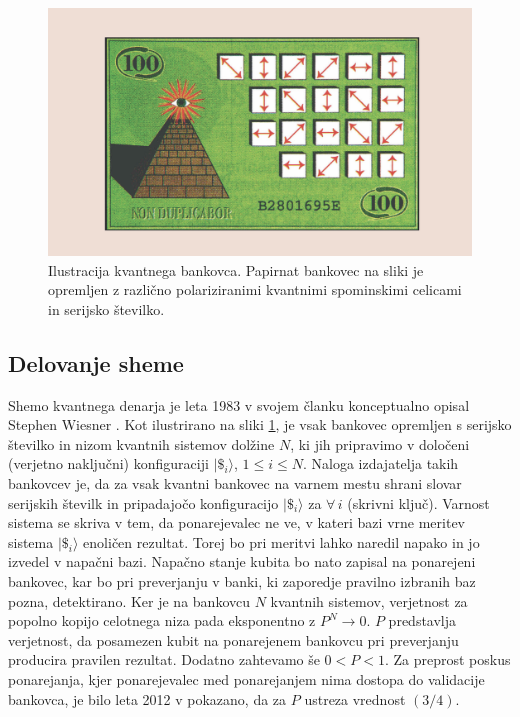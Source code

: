 \documentclass[12pt]{article}
\begin{document}
\begin{figure}[H]
\includegraphics[width=12cm]{qmon.png}
\centering
\caption{Ilustracija kvantnega bankovca. Papirnat bankovec na sliki je opremljen z različno polariziranimi kvantnimi spominskimi celicami in serijsko številko. \cite{aaronsonQuantumMoney2012}}
\label{fig:qmoney}
\end{figure}

\subsection{Delovanje sheme}

Shemo kvantnega denarja je leta 1983 v svojem članku konceptualno opisal Stephen Wiesner \cite{wiesnerConjugateCoding1983}. Kot ilustrirano na sliki \ref{fig:qmoney}, je vsak bankovec opremljen s serijsko številko in nizom kvantnih sistemov dolžine $N$, ki jih pripravimo v določeni (verjetno naključni) konfiguraciji $| \$_i \rangle$, $1 \le i \le N$. Naloga izdajatelja takih bankovcev je, da za vsak kvantni bankovec na varnem mestu shrani slovar serijskih številk in pripadajočo konfiguracijo $| \$_i \rangle$ za $\forall \, i$ (skrivni ključ). Varnost sistema se skriva v tem, da ponarejevalec ne ve, v kateri bazi vrne meritev sistema $| \$_i \rangle$ enoličen rezultat. Torej bo pri meritvi lahko naredil napako in jo izvedel v napačni bazi. Napačno stanje kubita bo nato zapisal na ponarejeni bankovec, kar bo pri preverjanju v banki, ki zaporedje pravilno izbranih baz pozna, detektirano. Ker je na bankovcu $N$ kvantnih sistemov, verjetnost za popolno kopijo celotnega niza pada eksponentno z $P^N \rightarrow 0$. $P$ predstavlja verjetnost, da posamezen kubit na ponarejenem bankovcu pri preverjanju producira pravilen rezultat. Dodatno zahtevamo še $0 < P < 1$. Za preprost poskus ponarejanja, kjer ponarejevalec med ponarejanjem nima dostopa do validacije bankovca, je bilo leta 2012 v \cite{molinaOptimalCounterfeitingAttacks2012} pokazano, da za $P$ ustreza vrednost $(3/4)$.
\end{document}
